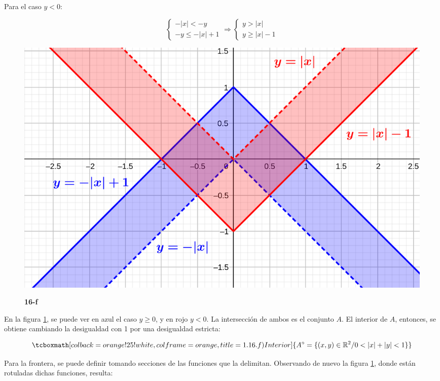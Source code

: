 \documentclass{article}
\renewcommand{\Bbb}{\mathbb}
\begin{document}
Para el caso $y < 0$:

\begin{equation}
\left\{
\begin{array}{ll}
-|x| < -y \\
-y \leq -|x| + 1
\end{array}
\right. \Rightarrow
\left\{
\begin{array}{ll}
y > |x| \\
y \geq |x| - 1
\end{array}
\right.
\end{equation}

\begin{figure}[ht]
\caption{\textbf{16-f}}
\includegraphics[scale=2.5]{../img/exercises/guide_01/16_f.png} 
\centering
\label{fig:1-16-f}
\end{figure}

En la figura \ref{fig:1-16-f}, se puede ver en azul el caso $y \geq 0$, y en rojo $y < 0$. La intersección de ambos es el conjunto $A$. El interior de $A$, entonces, se obtiene cambiando la desigualdad con 1 por una desigualdad estricta:

\begin{equation}
\tcboxmath[colback=orange!25!white,colframe=orange,title=1.16.f) Interior]
{ A^{\circ} = \{ (x,y) \in \Bbb R^2 / 0 < |x| + |y| < 1 \} }
\end{equation}

Para la frontera, se puede definir tomando secciones de las funciones que la delimitan. Observando de nuevo la figura \ref{fig:1-16-f}, donde están rotuladas dichas funciones, resulta:
\end{document}
